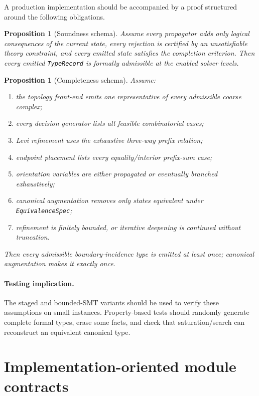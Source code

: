 \documentclass[11pt]{article}
\newtheorem{proposition}[definition]{Proposition}
\begin{document}
A production implementation should be accompanied by a proof structured around the following obligations.

\begin{proposition}[Soundness schema]
Assume every propagator adds only logical consequences of the current state, every rejection is certified by an unsatisfiable theory constraint, and every emitted state satisfies the completion criterion.  Then every emitted \texttt{TypeRecord} is formally admissible at the enabled solver levels.
\end{proposition}

\begin{proposition}[Completeness schema]
Assume:
\begin{enumerate}
  \item the topology front-end emits one representative of every admissible coarse complex;
  \item every decision generator lists all feasible combinatorial cases;
  \item Levi refinement uses the exhaustive three-way prefix relation;
  \item endpoint placement lists every equality/interior prefix-sum case;
  \item orientation variables are either propagated or eventually branched exhaustively;
  \item canonical augmentation removes only states equivalent under \texttt{EquivalenceSpec};
  \item refinement is finitely bounded, or iterative deepening is continued without truncation.
\end{enumerate}
Then every admissible boundary-incidence type is emitted at least once; canonical augmentation makes it exactly once.
\end{proposition}

\paragraph{Testing implication.}
The staged and bounded-SMT variants should be used to verify these assumptions on small instances.  Property-based tests should randomly generate complete formal types, erase some facts, and check that saturation/search can reconstruct an equivalent canonical type.

\section{Implementation-oriented module contracts}
\label{sec:modules}
\end{document}
